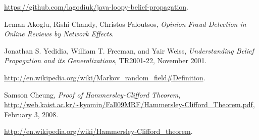 \documentclass[10pt]{article}
\begin{document}
\begin{thebibliography}{9}

  \url{https://github.com/lagodiuk/java-loopy-belief-propagation}.

  Leman Akoglu, Rishi Chandy, Christos Faloutsos,
  \emph{Opinion Fraud Detection in Online Reviews by Network Effects}.

  Jonathan S. Yedidia, William T. Freeman, and Yair Weiss,
  \emph{Understanding Belief Propagation and its Generalizations},
  TR2001-22, 
  November 2001.
  
  \url{http://en.wikipedia.org/wiki/Markov_random_field#Definition}.
  
  Samson Cheung,
  \emph{Proof of Hammersley-Clifford Theorem},
  \url{http://web.kaist.ac.kr/~kyomin/Fall09MRF/Hammersley-Clifford_Theorem.pdf},
  February 3, 2008.

  \url{http://en.wikipedia.org/wiki/Hammersley-Clifford_theorem}.

\end{thebibliography}
\end{document}
